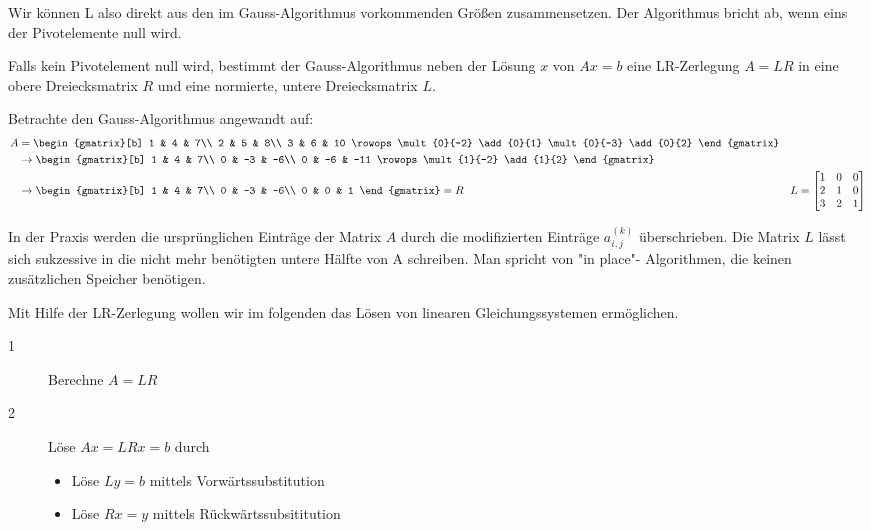Wir können L also direkt aus den im Gauss-Algorithmus vorkommenden Größen zusammensetzen. Der Algorithmus bricht ab, wenn eins der Pivotelemente null wird.

\begin{theorem}
	Falls kein Pivotelement null wird, bestimmt der Gauss-Algorithmus neben der Lösung $x$ von $Ax=b$ eine LR-Zerlegung $A=LR$ in eine obere Dreiecksmatrix $R$ und eine normierte, untere Dreiecksmatrix $L$.
\end{theorem}
\begin{example}
	\label{eg:gauss}
Betrachte den Gauss-Algorithmus angewandt auf:
\begin{align*}
	A &=
\begin{gmatrix}[b]
1 & 4 & 7\\
2 & 5 & 8\\
3 & 6 & 10
\rowops
\mult{0}{-2}
\add{0}{1}
\mult{0}{-3}
\add{0}{2}
\end{gmatrix} \\
	  &\to \begin{gmatrix}[b]
1 & 4 & 7\\
0 & -3 & -6\\
0 & -6 & -11
\rowops
\mult{1}{-2}
\add{1}{2}
\end{gmatrix} \\
	  &\to \begin{gmatrix}[b]
1 & 4 & 7\\
0 & -3 & -6\\
0 & 0 & 1
\end{gmatrix}=R
	  &L = \begin{bmatrix}
		  1 & 0 & 0 \\
		  2 & 1 & 0 \\
		  3 & 2 & 1
	  \end{bmatrix}
\end{align*} 
\end{example}
\begin{remark}
In der Praxis werden die ursprünglichen Einträge der Matrix $A$ durch die modifizierten Einträge $a_{i,j}^{(k)}$ überschrieben. Die Matrix $L$ lässt sich sukzessive in die nicht mehr benötigten untere Hälfte von A schreiben. Man spricht von "in place"- Algorithmen, die keinen zusätzlichen Speicher benötigen.
\end{remark}
Mit Hilfe der LR-Zerlegung wollen wir im folgenden das Lösen von linearen Gleichungssystemen ermöglichen.
\begin{description}
	\item[1] Berechne $A=LR$
	\item [2] Löse $Ax=LRx=b$ durch
		\begin{itemize}
			\item Löse $Ly =b $ mittels Vorwärtssubstitution
			\item Löse $Rx=y$ mittels Rückwärtssubsititution
		\end{itemize}
\end{description}
